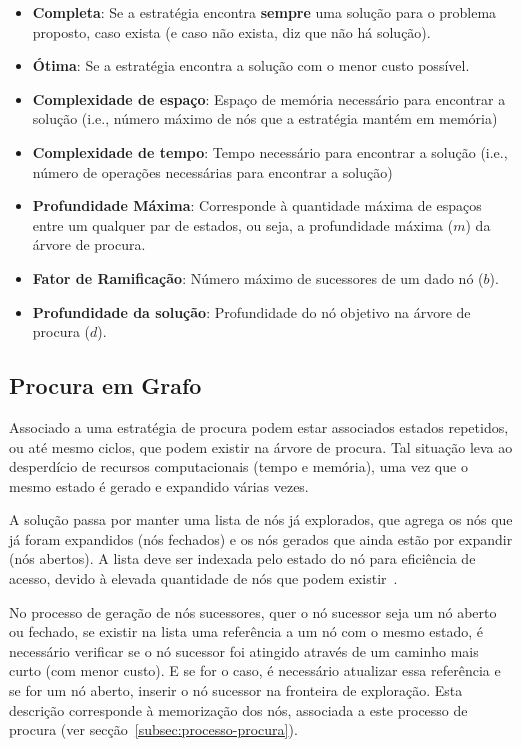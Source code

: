 \begin{itemize}
    \item \textbf{Completa}: Se a estratégia encontra \textbf{sempre} uma solução para o problema proposto, caso exista (e caso não exista, diz que não há solução).
    \item \textbf{Ótima}: Se a estratégia encontra a solução com o menor custo possível.
    \item \textbf{Complexidade de espaço}: Espaço de memória necessário para encontrar a solução (i.e., número máximo de nós que a estratégia mantém em memória)
    \item \textbf{Complexidade de tempo}: Tempo necessário para encontrar a solução (i.e., número de operações necessárias para encontrar a solução)
    \item \textbf{Profundidade Máxima}: Corresponde à quantidade máxima de espaços entre um qualquer par de estados, ou seja, a profundidade máxima ($m$) da árvore de procura.
    \item \textbf{Fator de Ramificação}: Número máximo de sucessores de um dado nó ($b$).
    \item \textbf{Profundidade da solução}: Profundidade do nó objetivo na árvore de procura ($d$).
\end{itemize}

\subsection{Procura em Grafo}\label{subsec:procura-grafo}

Associado a uma estratégia de procura podem estar associados estados repetidos, ou até mesmo ciclos, que podem existir na árvore de procura.
Tal situação leva ao desperdício de recursos computacionais (tempo e memória), uma vez que o mesmo estado é gerado e expandido várias vezes.

A solução passa por manter uma lista de nós já explorados, que agrega os nós que já foram expandidos (nós fechados) e os nós gerados que ainda estão por expandir (nós abertos).
A lista deve ser indexada pelo estado do nó para eficiência de acesso, devido à elevada quantidade de nós que podem existir~\cite{isel:iasa:slides:proc-espaco-estados-parte-1}.

No processo de geração de nós sucessores, quer o nó sucessor seja um nó aberto ou fechado, se existir na lista uma referência a um nó com o mesmo estado, é necessário verificar se o nó sucessor foi atingido através de um caminho mais curto (com menor custo).
E se for o caso, é necessário atualizar essa referência e se for um nó aberto, inserir o nó sucessor na fronteira de exploração.
Esta descrição corresponde à memorização dos nós, associada a este processo de procura (ver secção~\ref{subsec:processo-procura}).

